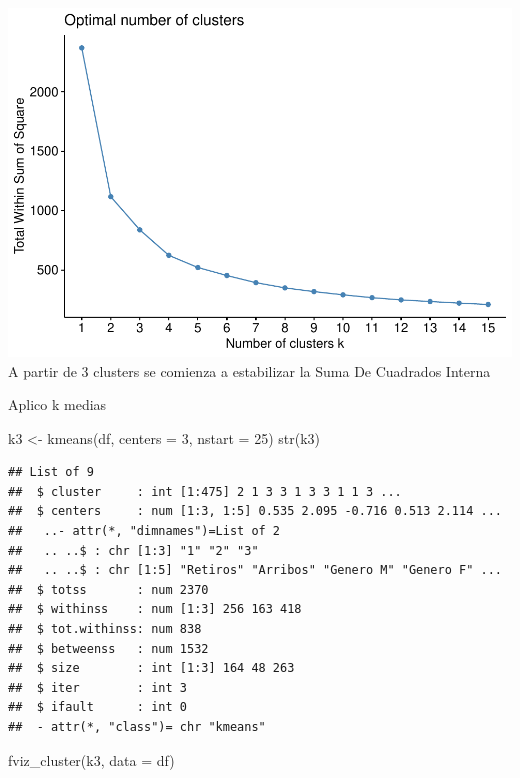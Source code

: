 \documentclass[
]{article}
\newenvironment{Shaded}{\begin{snugshade}}{\end{snugshade}}
\newcommand{\AttributeTok}[1]{\textcolor[rgb]{0.77,0.63,0.00}{#1}}
\newcommand{\DecValTok}[1]{\textcolor[rgb]{0.00,0.00,0.81}{#1}}
\newcommand{\FunctionTok}[1]{\textcolor[rgb]{0.00,0.00,0.00}{#1}}
\newcommand{\NormalTok}[1]{#1}
\newcommand{\OtherTok}[1]{\textcolor[rgb]{0.56,0.35,0.01}{#1}}
\begin{document}
\includegraphics{Ecobici_files/figure-latex/unnamed-chunk-13-1.pdf} A
partir de 3 clusters se comienza a estabilizar la Suma De Cuadrados
Interna

Aplico k medias

\begin{Shaded}
\begin{Highlighting}[]
\NormalTok{k3 }\OtherTok{\textless{}{-}} \FunctionTok{kmeans}\NormalTok{(df, }\AttributeTok{centers =} \DecValTok{3}\NormalTok{, }\AttributeTok{nstart =} \DecValTok{25}\NormalTok{)}
\FunctionTok{str}\NormalTok{(k3)}
\end{Highlighting}
\end{Shaded}

\begin{verbatim}
## List of 9
##  $ cluster     : int [1:475] 2 1 3 3 1 3 3 1 1 3 ...
##  $ centers     : num [1:3, 1:5] 0.535 2.095 -0.716 0.513 2.114 ...
##   ..- attr(*, "dimnames")=List of 2
##   .. ..$ : chr [1:3] "1" "2" "3"
##   .. ..$ : chr [1:5] "Retiros" "Arribos" "Genero M" "Genero F" ...
##  $ totss       : num 2370
##  $ withinss    : num [1:3] 256 163 418
##  $ tot.withinss: num 838
##  $ betweenss   : num 1532
##  $ size        : int [1:3] 164 48 263
##  $ iter        : int 3
##  $ ifault      : int 0
##  - attr(*, "class")= chr "kmeans"
\end{verbatim}

\begin{Shaded}
\begin{Highlighting}[]
\FunctionTok{fviz\_cluster}\NormalTok{(k3, }\AttributeTok{data =}\NormalTok{ df)}
\end{Highlighting}
\end{Shaded}
\end{document}
